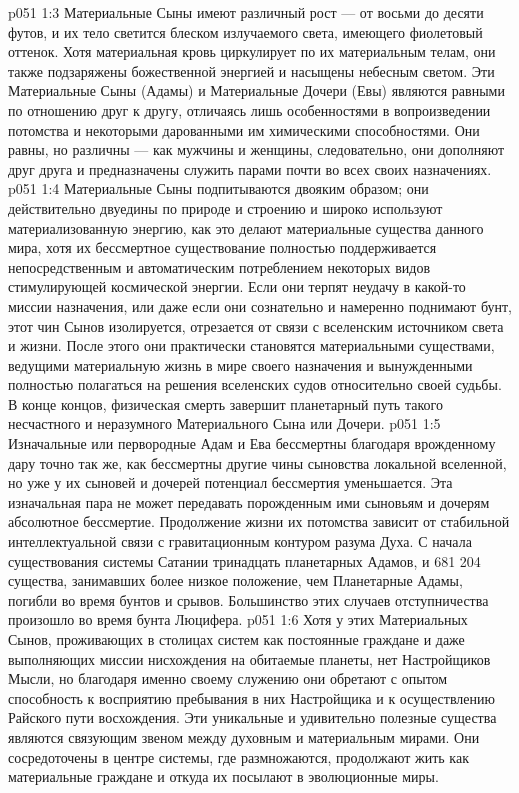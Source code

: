 \vs p051 1:3 \pc Материальные Сыны имеют различный рост --- от восьми до десяти футов, и их тело светится блеском излучаемого света, имеющего фиолетовый оттенок. Хотя материальная кровь циркулирует по их материальным телам, они также подзаряжены божественной энергией и насыщены небесным светом. Эти Материальные Сыны (Адамы) и Материальные Дочери (Евы) являются равными по отношению друг к другу, отличаясь лишь особенностями в вопроизведении потомства и некоторыми дарованными им химическими способностями. Они равны, но различны --- как мужчины и женщины, следовательно, они дополняют друг друга и предназначены служить парами почти во всех своих назначениях.
\vs p051 1:4 Материальные Сыны подпитываются двояким образом; они действительно двуедины по природе и строению и широко используют материализованную энергию, как это делают материальные существа данного мира, хотя их бессмертное существование полностью поддерживается непосредственным и автоматическим потреблением некоторых видов стимулирующей космической энергии. Если они терпят неудачу в какой\hyp{}то миссии назначения, или даже если они сознательно и намеренно поднимают бунт, этот чин Сынов изолируется, отрезается от связи с вселенским источником света и жизни. После этого они практически становятся материальными существами, ведущими материальную жизнь в мире своего назначения и вынужденными полностью полагаться на решения вселенских судов относительно своей судьбы. В конце концов, физическая смерть завершит планетарный путь такого несчастного и неразумного Материального Сына или Дочери.
\vs p051 1:5 Изначальные или первородные Адам и Ева бессмертны благодаря врожденному дару точно так же, как бессмертны другие чины сыновства локальной вселенной, но уже у их сыновей и дочерей потенциал бессмертия уменьшается. Эта изначальная пара не может передавать порожденным ими сыновьям и дочерям абсолютное бессмертие. Продолжение жизни их потомства зависит от стабильной интеллектуальной связи с гравитационным контуром разума Духа. С начала существования системы Сатании тринадцать планетарных Адамов, и 681 204 существа, занимавших более низкое положение, чем Планетарные Адамы, погибли во время бунтов и срывов. Большинство этих случаев отступничества произошло во время бунта Люцифера.
\vs p051 1:6 \pc Хотя у этих Материальных Сынов, проживающих в столицах систем как постоянные граждане и даже выполняющих миссии нисхождения на обитаемые планеты, нет Настройщиков Мысли, но благодаря именно своему служению они обретают с опытом способность к восприятию пребывания в них Настройщика и к осуществлению Райского пути восхождения. Эти уникальные и удивительно полезные существа являются связующим звеном между духовным и материальным мирами. Они сосредоточены в центре системы, где размножаются, продолжают жить как материальные граждане и откуда их посылают в эволюционные миры.
